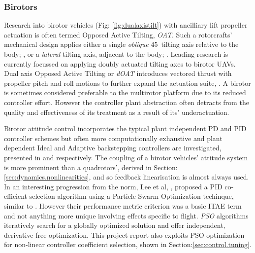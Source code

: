 \subsubsection*{Birotors}
Research into birotor vehicles (Fig: \ref{fig:dualaxistilt}) with ancilliary lift propeller actuation is often termed Opposed Active Tilting, \emph{OAT}. Such a rotorcrafts' mechanical design applies either a single \emph{oblique} 45\textdegree ~tilting axis relative to the body; \cite{smalltwotilting,obliquepitch,passiveobliquetilting}, or a \emph{lateral} tilting axis, adjacent to the body; \cite{tiltrotorUAV,adaptivebackstep,tiltrotorcontrol,tpheonix}. Leading research is currently focussed on applying doubly actuated tilting axes to birotor UAVs. Dual axis Opposed Active Tilting or \emph{dOAT} introduces vectored thrust with propeller pitch and roll motions to further expand the actuation suite, \cite{gres2007,opposedlateraldualaxis}. A birotor is sometimes considered preferable to the multirotor platform due to its reduced controller effort. However the controller plant abstraction often detracts from the quality and effectiveness of its treatment as a result of its' underactuation. 
\par
Birotor attitude control incorporates the typical plant independent PD \cite{obliquepitch} and PID \cite{tiltrotorUAV} controller schemes but often more computationally exhaustive and plant dependent Ideal and Adaptive backstepping controllers are investigated, presented in \cite{smalltwotilting,tpheonix} and \cite{adaptivebackstep} respectively. The coupling of a birotor vehicles' attitude system is more prominent than a quadrotors', derived in Section: \ref{sec:dynamics.nonlinearities}, and so feedback linearisation is almost always used. In an interesting progression from the norm, Lee et al,  \cite{autopilotPSO}, proposed a PID co-efficient selection algorithm using a Particle Swarm Optimization techinque, similar to \cite{adaptivepso}. However their performance metric criterion was a basic ITAE term and not anything more unique involving effects specific to flight. \emph{PSO} algorithms iteratively search for a globally optimized solution and offer independent, derivative free optimization. This project report also exploits PSO optimization for non-linear controller coefficient selection, shown in Section:\ref{sec:control.tuning}.
\par
